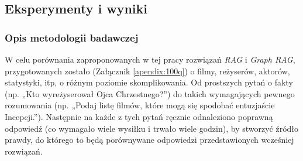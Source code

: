 \documentclass[
a4paper,
12pt,
]{article}
\renewcommand\appendixname{Załącznik}
\begin{document}
\subsection{Eksperymenty i wyniki}

\subsubsection{Opis metodologii badawczej}

W celu porównania zaproponowanych w tej pracy rozwiązań \textit{RAG} i \textit{Graph RAG}, przygotowanych zostało 
(\appendixname{}  \ref{apendix:100q})
o filmy, reżyserów, aktorów, statystyki, itp, o różnym poziomie skomplikowania. Od prostszych pytań o fakty (np. „Kto wyreżyserował Ojca Chrzestnego?”) do takich wymagających pewnego rozumowania (np. „Podaj listę filmów, które mogą się spodobać entuzjaście Incepcji.”).
% 
Następnie na każde z tych pytań ręcznie odnaleziono poprawną odpowiedź (co wymagało wiele wysiłku i trwało wiele godzin), by stworzyć źródło prawdy, do którego to będą porównywane odpowiedzi przedstawionych wcześniej rozwiązań. 
\end{document}

